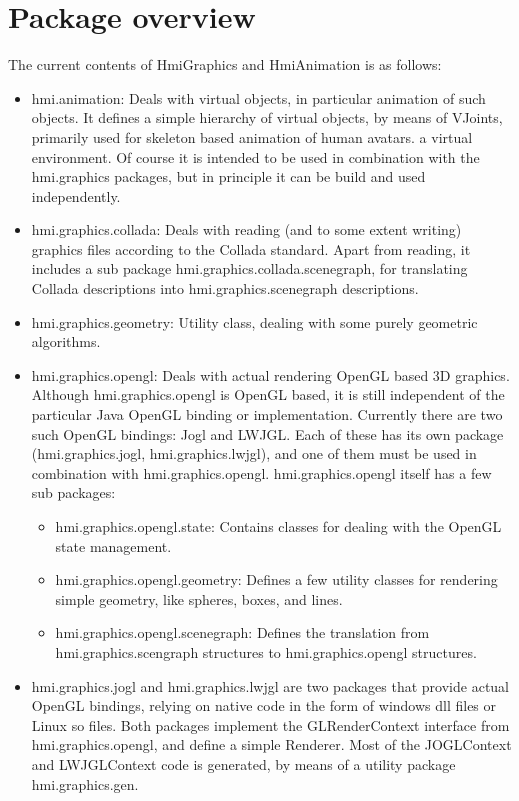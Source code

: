 \section{Package overview}
The current contents of HmiGraphics and HmiAnimation is as follows:

\begin{itemize}
\item hmi.animation:
Deals with virtual objects, in particular animation of such objects. It defines a simple hierarchy of
virtual objects, by means of VJoints, primarily used for skeleton based animation of human avatars.
a virtual environment. Of course it is intended to be used in combination with the hmi.graphics packages,
but in principle it can be build and used independently.
\item hmi.graphics.collada:
Deals with reading (and to some extent writing) graphics files according to the Collada standard.
Apart from reading, it includes a sub package hmi.graphics.collada.scenegraph, for translating Collada descriptions into
hmi.graphics.scenegraph descriptions.
\item hmi.graphics.geometry:
Utility class, dealing with some purely geometric algorithms.
\item hmi.graphics.opengl:
Deals with actual rendering OpenGL based 3D graphics.
Although hmi.graphics.opengl is OpenGL based, it is still independent
of the  particular Java OpenGL binding or implementation. Currently there are two such OpenGL bindings: Jogl and LWJGL.
Each of these has its own package (hmi.graphics.jogl, hmi.graphics.lwjgl), and one of them must be used in combination with hmi.graphics.opengl.
hmi.graphics.opengl itself has a few sub packages:
\begin{itemize}
\item hmi.graphics.opengl.state: Contains classes for dealing with the OpenGL state management.
\item hmi.graphics.opengl.geometry: Defines a few utility classes for rendering simple geometry, like spheres, boxes, and lines.
\item hmi.graphics.opengl.scenegraph: Defines the translation from hmi.graphics.scengraph structures to hmi.graphics.opengl structures.
\end{itemize}

\item hmi.graphics.jogl and hmi.graphics.lwjgl are two packages that provide
actual OpenGL bindings, relying on native code in the form of windows dll files or Linux so files.
Both packages implement the GLRenderContext interface from hmi.graphics.opengl, and define
a simple Renderer.
Most of the JOGLContext and LWJGLContext code is generated, by means of a utility package hmi.graphics.gen.



\end{itemize}
